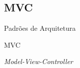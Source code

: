 \documentclass[
	9pt, %
	t, %
]{beamer}
\begin{document}

\subsection{MVC}

\begin{frame}
	\begin{center}
		
		\bigskip\bigskip\bigskip\bigskip %
		{\Large Padrões de Arquitetura}
		
		\bigskip\bigskip %
		{\Huge MVC}
		
		\smallskip
		{\small \textit{Model-View-Controller}}
	\end{center}

\end{frame}
\end{document}

